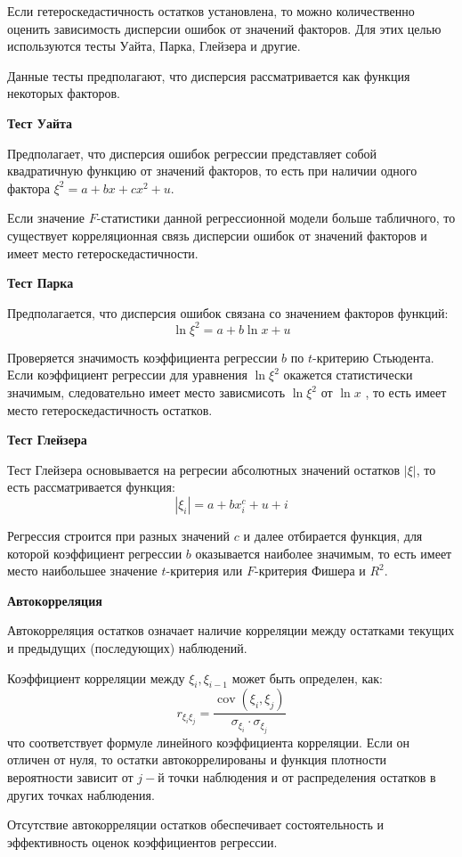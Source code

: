 \documentclass[aps,%
12pt,%
final,%
oneside,
onecolumn,%
musixtex, %
superscriptaddress,%
centertags]{article} %
\theoremstyle{plain}
\theoremstyle{definition}
\theoremstyle{remark}
\begin{document}
Если гетероскедастичность остатков установлена, то можно количественно оценить зависимость дисперсии ошибок от значений факторов. Для этих целью используются тесты Уайта, Парка, Глейзера и другие.

Данные тесты предполагают, что дисперсия рассматривается как функция некоторых факторов.

\textbf{Тест Уайта}

Предполагает, что дисперсия ошибок регрессии представляет собой квадратичную функцию от значений факторов, то есть при наличии одного фактора $\xi^2 = a + bx + cx^2 + u$.

Если значение $F$-статистики данной регрессионной модели больше табличного, то существует корреляционная связь дисперсии ошибок от значений факторов и имеет место гетероскедастичности.

\textbf{Тест Парка}

Предполагается, что дисперсия ошибок связана со значением факторов функций:
$$\ln \xi^2 = a +b\ln x + u$$

Проверяется значимость коэффициента регрессии $b$ по $t$-критерию Стьюдента. Если коэффициент регрессии для уравнения $\ln \xi^2$ окажется статистически значимым, следовательно имеет место зависмисоть $\ln \xi^2$ от $\ln x$ , то есть имеет место гетероскедастичность остатков.

\textbf{Тест Глейзера}

Тест Глейзера основывается на регресии абсолютных значений остатков $|\xi|$, то есть рассматривается функция:
$$|\xi_i| = a + bx_i^c + u+i$$

Регрессия строится при разных значений $c$ и далее отбирается функция, для которой коэффициент регрессии $b$ оказывается наиболее значимым, то есть имеет место наибольшее значение $t$-критерия или $F$-критерия Фишера и $R^2$.

\textbf{Автокорреляция}

Автокорреляция остатков означает наличие корреляции между остатками текущих и предыдущих (последующих) наблюдений.

Коэффициент корреляции между $\xi_i,\xi_{i-1}$ может быть определен, как:
$$r_{\xi_i\xi_j} = \frac{\operatorname{cov}(\xi_i,\xi_j)}{\sigma_{\xi_i}\cdot \sigma_{\xi_j}}$$
что соответствует формуле линейного коэффициента корреляции. Если он отличен от нуля, то остатки автокоррелированы и функция плотности вероятности зависит от $j-$й точки наблюдения и от распределения остатков в других точках наблюдения.

Отсутствие автокорреляции остатков обеспечивает состоятельность и эффективность оценок коэффициентов регрессии. 
\end{document}
